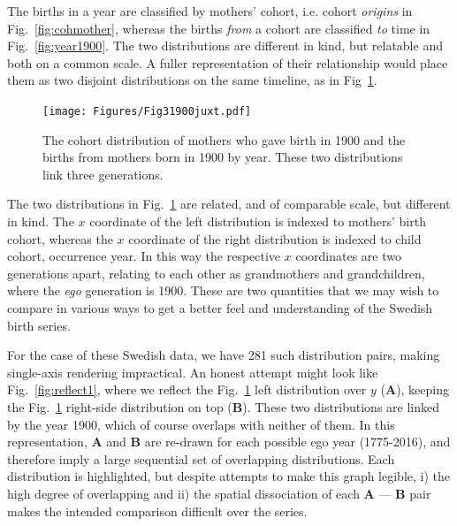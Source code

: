 \documentclass{article}
\begin{document}
The births in a year are classified by mothers' cohort, i.e. cohort \emph{origins} in Fig.~\ref{fig:cohmother}, whereas the births \emph{from} a cohort are classified \emph{to} time in Fig.~\ref{fig:year1900}. The two distributions are different in kind, but relatable and both on a common scale. A fuller representation of their relationship would place them as two disjoint distributions on the same timeline, as in Fig~\ref{fig:juxt}.

\begin{figure}[ht!]
 \centering
        \texttt{[image: Figures/Fig31900juxt.pdf]}
        \caption{The cohort distribution of mothers who gave birth in 1900 and the births from mothers born in 1900 by year. These two distributions link three generations.}
          \label{fig:juxt}
\end{figure}

The two distributions in Fig.~\ref{fig:juxt} are related, and of comparable scale, but different in kind. The $x$ coordinate of the left distribution is indexed to mothers' birth cohort, whereas the $x$ coordinate of the right distribution is indexed to child cohort, occurrence year. In this way the respective $x$ coordinates are two generations apart, relating to each other as grandmothers and grandchildren, where the \emph{ego} generation is 1900. These are two quantities that we may wish to compare in various ways to get a better feel and understanding of the Swedish birth series. 

For the case of these Swedish data, we have 281 such distribution pairs, making single-axis rendering impractical. An honest attempt might look like Fig.~\ref{fig:reflect1}, where we reflect the Fig.~\ref{fig:juxt} left distribution over $y$ (\textbf{A}), keeping the Fig.~\ref{fig:juxt} right-side distribution on top (\textbf{B}). These two distributions are linked by the year 1900, which of course overlaps with neither of them. In this representation, \textbf{A} and \textbf{B} are re-drawn for each possible ego year (1775-2016), and therefore imply a large sequential set of overlapping distributions. Each  distribution is highlighted, but despite attempts to make this graph legible, i) the high degree of overlapping and ii) the spatial dissociation of each \textbf{A} --- \textbf{B} pair makes the intended comparison difficult over the series.
\end{document}
